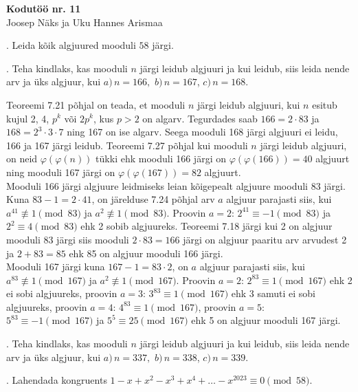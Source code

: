 \documentclass[a4paper, 10pt]{article}
\begin{document}
\begin{center}
\Large\textbf{Kodutöö nr. 11}\\
\small{Joosep Näks ja Uku Hannes Arismaa}
\end{center}

\bigskip

\bigskip

. Leida kõik algjuured mooduli $58$ järgi.

\bigskip

. Teha kindlaks, kas mooduli $n$ järgi leidub algjuuri ja kui leidub, siis leida nende arv ja üks algjuur, kui $a)\, n=166,$ $b)\, n=167$, $c)\, n=168$.

\bigskip
Teoreemi 7.21 põhjal on teada, et mooduli $n$ järgi leidub algjuuri, kui $n$ esitub kujul 2, 4, $p^k$ või $2p^k$, kus $p>2$ on algarv. Tegurdades saab $166=2\cdot83$ ja $168=2^3\cdot3\cdot7$ ning 167 on ise algarv. Seega mooduli 168 järgi algjuuri ei leidu, 166 ja 167 järgi leidub. Teoreemi 7.27 põhjal kui mooduli $n$ järgi leidub algjuuri, on neid $\varphi(\varphi(n))$ tükki ehk mooduli 166 järgi on $\varphi(\varphi(166))=40$ algjuurt ning mooduli 167 järgi on $\varphi(\varphi(167))=82$ algjuurt.\\
Mooduli 166 järgi algjuure leidmiseks leian kõigepealt algjuure mooduli 83 järgi. Kuna $83-1=2\cdot41$, on järelduse 7.24 põhjal arv $a$ algjuur parajasti siis, kui $a^{41}\not\equiv1\pmod{83}$ ja $a^2\not\equiv1\pmod{83}$. Proovin $a=2$: $2^{41}\equiv-1\pmod{83}$ ja $2^{2}\equiv4\pmod{83}$ ehk 2 sobib algjuureks. Teoreemi 7.18 järgi kui 2 on algjuur mooduli 83 järgi siis mooduli $2\cdot83=166$ järgi on algjuur paaritu arv arvudest 2 ja $2+83=85$ ehk 85 on algjuur mooduli 166 järgi.\\
Mooduli 167 järgi kuna $167-1=83\cdot2$, on $a$ algjuur parajasti siis, kui \mbox{$a^{83}\not\equiv1\pmod{167}$} ja \mbox{$a^2\not\equiv1\pmod{167}$}. Proovin $a=2$: $2^{83}\equiv1\pmod{167}$ ehk 2 ei sobi algjuureks, proovin $a=3$: $3^{83}\equiv1\pmod{167}$ ehk 3 samuti ei sobi algjuureks, proovin $a=4$: $4^{83}\equiv1\pmod{167}$, proovin $a=5$: $5^{83}\equiv-1\pmod{167}$ ja $5^5\equiv25\pmod{167}$ ehk 5 on algjuur mooduli 167 järgi.
\bigskip

. Teha kindlaks, kas mooduli $n$ järgi leidub algjuuri ja kui leidub, siis leida nende arv ja üks algjuur, kui $a)\, n=337,$ $b)\, n=338$, $c)\, n=339$.

\bigskip

. Lahendada kongruents $1-x+x^2-x^3+x^4+\ldots-x^{2023} \equiv 0 \pmod{58}$. 
\end{document}
